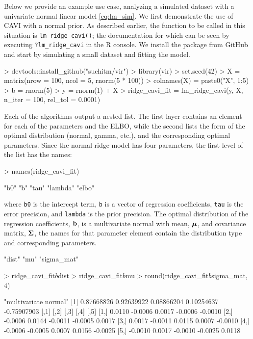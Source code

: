 \documentclass[]{article}
\newcommand{\V}[1]{{\bm{\mathbf{\MakeLowercase{#1}}}}} %
\newcommand{\M}[1]{{\bm{\mathbf{\MakeUppercase{#1}}}}} %
\def\b{{\bf b}}
\def \vmu{{\V{\mu}}}
\def \msigma{{\M{\Sigma}}}
\let\code=\texttt
\newcommand{\fct}[1]{\code{#1()}}
\newenvironment{CodeChunk}{}{}
\let\proglang=\textsf
\begin{document}
Below we provide an example use case, analyzing a simulated dataset with a
univariate normal linear model \eqref{eq:lm_sim}. We first demonstrate the use
of CAVI with a normal prior. As described earlier, the function to be called in
this situation is \fct{lm\_ridge\_cavi}; the documentation for which can be seen
by executing \code{?lm\_ridge\_cavi} in the \proglang{R} console. We install the
package from GitHub and start by simulating a small dataset and fitting the
model.
\begin{CodeChunk}
\begin{CodeInput}
> devtools::install_github("suchitm/vir")
> library(vir)
> set.seed(42)
> X = matrix(nrow = 100, ncol = 5, rnorm(5 * 100))
> colnames(X) = paste0("X", 1:5)
> b = rnorm(5)
> y = rnorm(1) + X %
> ridge_cavi_fit = lm_ridge_cavi(y, X, n_iter = 100, rel_tol = 0.0001)
\end{CodeInput}
\end{CodeChunk}
Each of the algorithms output a nested list. The first layer contains an element
for each of the parameters and the ELBO, while the second lists the form of the
optimal distribution (normal, gamma, etc.), and the corresponding optimal
parameters. Since the normal ridge model has four parameters, the first level of
the list has the names: 
\begin{CodeChunk}
\begin{CodeInput}
> names(ridge_cavi_fit)
\end{CodeInput}
\begin{CodeOutput}
[1] "b0"     "b"      "tau"    "lambda" "elbo"  
\end{CodeOutput}
\end{CodeChunk} 
where \code{b0} is the intercept term, \code{b} is a vector of regression
coefficients, \code{tau} is the error precision, and \code{lambda} is the prior
precision. The optimal distribution of the regression coefficients, $\b$, is a
multivariate normal with mean, $\vmu$, and covariance matrix, $\msigma$, the
names for that parameter element contain the distribution type and corresponding
parameters. 
\begin{CodeChunk}
\begin{CodeOutput}
[1] "dist"      "mu"        "sigma_mat"
\end{CodeOutput}
\end{CodeChunk}
\begin{CodeChunk}
\begin{CodeInput}
> ridge_cavi_fit$b$dist
> ridge_cavi_fit$b$mu
> round(ridge_cavi_fit$b$sigma_mat, 4)
\end{CodeInput}
\begin{CodeOutput}
[1] "multivariate normal"
[1]  0.87668826  0.92639922  0.08866204  0.10254637 -0.75907903
        [,1]    [,2]    [,3]    [,4]    [,5]
[1,]  0.0110 -0.0006  0.0017 -0.0006 -0.0010
[2,] -0.0006  0.0144 -0.0011 -0.0005  0.0017
[3,]  0.0017 -0.0011  0.0115  0.0007 -0.0010
[4,] -0.0006 -0.0005  0.0007  0.0156 -0.0025
[5,] -0.0010  0.0017 -0.0010 -0.0025  0.0118
\end{CodeOutput}
\end{CodeChunk}
\end{document}
